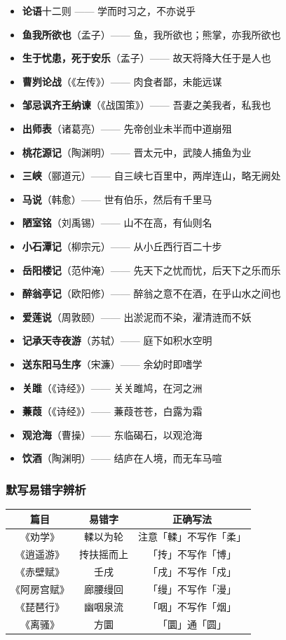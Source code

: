 \begin{itemize}
  \item \textbf{论语}十二则 —— 学而时习之，不亦说乎
  \item \textbf{鱼我所欲也}（孟子）—— 鱼，我所欲也；熊掌，亦我所欲也
  \item \textbf{生于忧患，死于安乐}（孟子）—— 故天将降大任于是人也
  \item \textbf{曹刿论战}（《左传》）—— 肉食者鄙，未能远谋
  \item \textbf{邹忌讽齐王纳谏}（《战国策》）—— 吾妻之美我者，私我也
  \item \textbf{出师表}（诸葛亮）—— 先帝创业未半而中道崩殂
  \item \textbf{桃花源记}（陶渊明）—— 晋太元中，武陵人捕鱼为业
  \item \textbf{三峡}（郦道元）—— 自三峡七百里中，两岸连山，略无阙处
  \item \textbf{马说}（韩愈）—— 世有伯乐，然后有千里马
  \item \textbf{陋室铭}（刘禹锡）—— 山不在高，有仙则名
  \item \textbf{小石潭记}（柳宗元）—— 从小丘西行百二十步
  \item \textbf{岳阳楼记}（范仲淹）—— 先天下之忧而忧，后天下之乐而乐
  \item \textbf{醉翁亭记}（欧阳修）—— 醉翁之意不在酒，在乎山水之间也
  \item \textbf{爱莲说}（周敦颐）—— 出淤泥而不染，濯清涟而不妖
  \item \textbf{记承天寺夜游}（苏轼）—— 庭下如积水空明
  \item \textbf{送东阳马生序}（宋濂）—— 余幼时即嗜学
  \item \textbf{关雎}（《诗经》）—— 关关雎鸠，在河之洲
  \item \textbf{蒹葭}（《诗经》）—— 蒹葭苍苍，白露为霜
  \item \textbf{观沧海}（曹操）—— 东临碣石，以观沧海
  \item \textbf{饮酒}（陶渊明）—— 结庐在人境，而无车马喧
\end{itemize}

\subsubsection{默写易错字辨析}

\begin{center}
\begin{tabular}{c|c|c}
\textbf{篇目} & \textbf{易错字} & \textbf{正确写法} \\ \hline
《劝学》 & 輮以为轮 & 注意「輮」不写作「柔」 \\
《逍遥游》 & 抟扶摇而上 & 「抟」不写作「博」 \\
《赤壁赋》 & 壬戌 & 「戌」不写作「戍」 \\
《阿房宫赋》 & 廊腰缦回 & 「缦」不写作「漫」 \\
《琵琶行》 & 幽咽泉流 & 「咽」不写作「烟」 \\
《离骚》 & 方圜 & 「圜」通「圆」 \\
\end{tabular}
\end{center}

